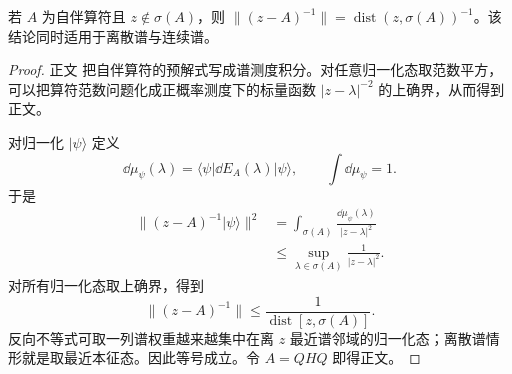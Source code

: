 \begin{theorem}[自伴预解式的精确范数]
若 $A$ 为自伴算符且 $z\notin\sigma(A)$，则 $\|(z-A)^{-1}\|=\operatorname{dist}(z,\sigma(A))^{-1}$。该结论同时适用于离散谱与连续谱。
\end{theorem}
\begin{proof}
正文 把自伴算符的预解式写成谱测度积分。对任意归一化态取范数平方，可以把算符范数问题化成正概率测度下的标量函数 $|z-\lambda|^{-2}$ 的上确界，从而得到正文。

对归一化 $|\psi\rangle$ 定义
\begin{equation*}
 \dd\mu_\psi(\lambda)
 =\langle\psi|\dd E_A(\lambda)|\psi\rangle,
 \qquad
 \int\dd\mu_\psi=1.
\end{equation*}
于是
\begin{align*}
 \|(z-A)^{-1}|\psi\rangle\|^2
 &=\int_{\sigma(A)}
 \frac{\dd\mu_\psi(\lambda)}{|z-\lambda|^2}\\
 &\le
 \sup_{\lambda\in\sigma(A)}\frac1{|z-\lambda|^2}.
\end{align*}
对所有归一化态取上确界，得到
\begin{equation*}
 \|(z-A)^{-1}\|
 \le\frac1{\operatorname{dist}[z,\sigma(A)]}.
\end{equation*}
反向不等式可取一列谱权重越来越集中在离 $z$ 最近谱邻域的归一化态；离散谱情形就是取最近本征态。因此等号成立。令 $A=QHQ$ 即得正文。
\end{proof}

